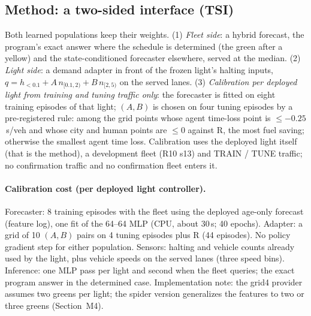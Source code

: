 \documentclass[11pt]{article}
\begin{document}
\subsection{Method: a two-sided interface (TSI)}
Both learned populations keep their weights. (1) \emph{Fleet side}: a hybrid forecast, the program's exact answer where the schedule is
determined (the green after a yellow) and the state-conditioned forecaster elsewhere, served at the median. (2) \emph{Light side}: a demand
adapter in front of the frozen light's halting inputs, $q = h_{<0.1} + A\,n_{[0.1,2)} + B\,n_{[2,5)}$ on the served lanes. (3)
\emph{Calibration per deployed light from training and tuning traffic only}: the forecaster is fitted on eight training episodes of that light; $(A,B)$
is chosen on four tuning episodes by a pre-registered rule: among the grid points whose agent time-loss point is $\le -0.25$\,s/veh and
whose city and human points are $\le 0$ against R, the most fuel saving; otherwise the smallest agent time loss. Calibration uses the
deployed light itself (that is the method), a development fleet (R10 s13) and TRAIN / TUNE traffic; no confirmation traffic and no
confirmation fleet enters it.

\paragraph{Calibration cost (per deployed light controller).} Forecaster: 8 training episodes with the fleet using the deployed age-only
forecast (feature log), one fit of the 64--64 MLP (CPU, about 30\,s; 40 epochs). Adapter: a grid of 10 $(A,B)$
pairs on 4 tuning episodes plus R (44 episodes). No policy gradient step for either population. Sensors: halting and vehicle counts already
used by the light, plus vehicle speeds on the served lanes (three speed bins). Inference: one MLP pass per light and second when the fleet
queries; the exact program answer in the determined case. Implementation note: the grid4 provider assumes two greens per light; the spider
version generalizes the features to two or three greens (Section~M4).
\end{document}
